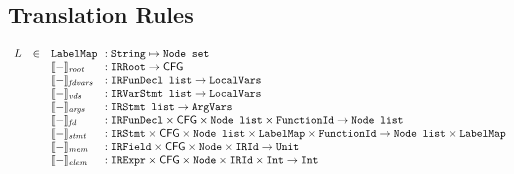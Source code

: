 \subsection{Translation Rules}
\[
\begin{array}{rll@{~~}l}
L&\in&\TT{LabelMap} &: \TT{String} \mapsto\Nodeset \\
&&\transfun{-}_{\emph{root}} &: \TT{IRRoot} \rightarrow  \CFG \\
&&\transfun{-}_{\emph{fdvars}} &: \TT{IRFunDecl list} \rightarrow \LocalVars \\
&&\transfun{-}_{\emph{vds}} &: \TT{IRVarStmt list} \rightarrow \LocalVars \\
&&\transfun{-}_{\emph{args}} &: \TT{IRStmt list} \rightarrow \ArgVars \\
&&\transfun{-}_{\emph{fd}} &: \TT{IRFunDecl} \times \CFG \times\Nodelist  \times \FunctionId\rightarrow\Nodelist \\
&&\transfun{-}_{\emph{stmt}} &: \TT{IRStmt} \times \CFG \times\Nodelist \times \TT{LabelMap} \times \FunctionId \rightarrow\Nodelist \times \TT{LabelMap}\\
&&\transfun{-}_{\emph{mem}} &: \TT{IRField} \times \CFG \times\Node \times \TT{IRId} \rightarrow \Unit \\
&&\transfun{-}_{\emph{elem}} &: \TT{IRExpr} \times \CFG \times\Node \times \TT{IRId} \times \TT{Int} \rightarrow \tt{Int} \\

\end{array}
\]

